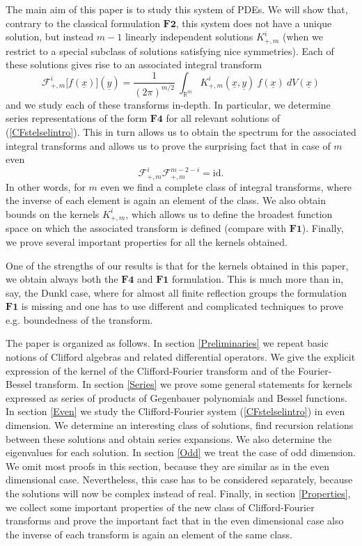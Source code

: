 \documentclass{amsart}
\theoremstyle{remark}
\begin{document}
The main aim of this paper is to study this system of PDEs. We will show that, contrary to the classical formulation $\textbf{F2}$, this system does not have a unique solution, but instead $m-1$ linearly independent solutions $K_{+,m}^{i}$ (when we restrict to a special subclass of solutions satisfying nice symmetries). Each of these solutions gives rise to an associated integral transform
\[
\mathcal{F}^{i}_{+,m} \lbrack f({\underline{x}}) \rbrack ({\underline{y}}) = \frac{1}{(2 \pi)^{m/2}} \  \int_{\mathbb{R}^m} K^{i}_{+,m}({\underline{x}},{\underline{y}}) \ f({\underline{x}}) \ dV({\underline{x}})
\]
and we study each of these transforms in-depth. In particular, we determine series representations of the form $\textbf{F4}$ for all relevant solutions of (\ref{CFstelselintro}). This in turn allows us to obtain the spectrum for the associated integral transforms and allows us to prove the surprising fact that in case of $m$ even
\[
\mathcal{F}^{i}_{+,m} \mathcal{F}^{m-2-i}_{+,m} = \mbox{id}.
\]
In other words, for $m$ even we find a complete class of integral transforms, where the inverse of each element is again an element of the class.
We also obtain bounds on the kernels $K_{+,m}^{i}$, which allows us to define the broadest function space on which the associated transform is defined (compare with $\textbf{F1}$). Finally, we prove several important properties for all the kernels obtained.

One of the strengths of our results is that for the kernels obtained in this paper, we obtain always both the $\textbf{F4}$ and $\textbf{F1}$ formulation. This is much more than in, say, the Dunkl case, where for almost all finite reflection groups the formulation $\textbf{F1}$ is missing and one has to use different and complicated techniques to prove e.g. boundedness of the transform.

The paper is organized as follows. In section \ref{Preliminaries} we repeat basic notions of Clifford algebras and related differential operators. We give the explicit expression of the kernel of the Clifford-Fourier transform and of the Fourier-Bessel transform. In section \ref{Series} we prove some general statements for kernels expressed as series of products of Gegenbauer polynomials and Bessel functions. In section \ref{Even} we study the Clifford-Fourier system (\ref{CFstelselintro}) in even dimension. We determine an interesting class of solutions, find recursion relations between these solutions and obtain series expansions. We also determine the eigenvalues for each solution. In section \ref{Odd} we treat the case of odd dimension. We omit most proofs in this section, because they are similar as in the even dimensional case. Nevertheless, this case has to be considered separately, because the solutions will now be complex instead of real. Finally, in section \ref{Properties}, we collect some important properties of the new class of Clifford-Fourier transforms and prove the important fact that in the even dimensional case also the inverse of each transform is again an element of the same class.
\end{document}
